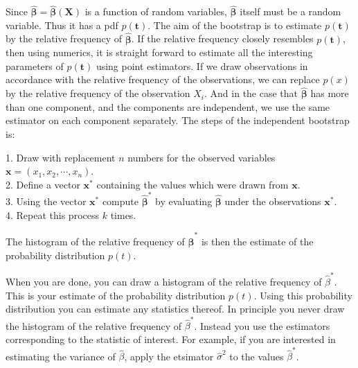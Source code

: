 Since $\boldsymbol{\hat{\beta}}=\boldsymbol{\hat\beta}(\boldsymbol{X})$ is a function of random variables, $\boldsymbol{\hat\beta}$ itself must be a random variable. Thus it has
a pdf $p(\boldsymbol{t})$. The aim of the bootstrap is to
estimate $p(\boldsymbol{t})$ by the relative frequency of
$\boldsymbol{\hat\beta}$. If the relative frequency closely
resembles $p(\boldsymbol{t})$, then using numerics, it is straight forward to
estimate all the interesting parameters of $p(\boldsymbol{t})$ using point
estimators. If we draw observations in accordance with
the relative frequency of the observations, we can replace $p(x)$ by the relative frequency of the observation $X_i$. And in the case that $\boldsymbol{\hat\beta}$ has
more than one component, and the components are independent, we use the
same estimator on each component separately. The steps of the independent bootstrap is:

\begin{mdframed}[backgroundcolor=black!10]
\raggedright
1. Draw with replacement $n$ numbers for the observed variables $\boldsymbol{x} = (x_1,x_2,\cdots,x_n)$. \\
2. Define a vector $\boldsymbol{x}^*$ containing the values which were drawn from $\boldsymbol{x}$. \\
3. Using the vector $\boldsymbol{x}^*$ compute $\boldsymbol{\hat\beta}^*$ by evaluating $\boldsymbol{\hat\beta}$ under the observations $\boldsymbol{x}^*$. \\
4. Repeat this process $k$ times. 
\end{mdframed}
The histogram of the relative frequency of $\boldsymbol{\hat\beta}^*$ is then the estimate of the probability distribution $p(t)$.


When you are done, you can draw a histogram of the relative frequency
of $\widehat \beta^*$. This is your estimate of the probability
distribution $p(t)$. Using this probability distribution you can
estimate any statistics thereof. In principle you never draw the
histogram of the relative frequency of $\widehat{\beta}^*$. Instead
you use the estimators corresponding to the statistic of interest. For
example, if you are interested in estimating the variance of $\widehat
\beta$, apply the etsimator $\widehat \sigma^2$ to the values
$\widehat \beta^*$.



